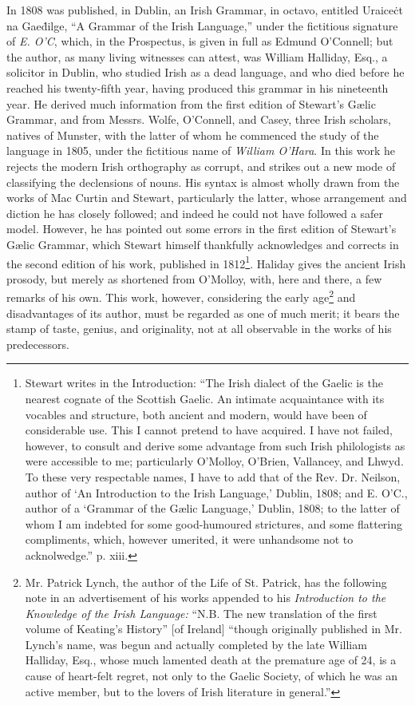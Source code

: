 \documentclass[11pt,oneside]{memoir}
\begin{document}
In 1808 was published, in Dublin, an Irish Grammar, in octavo, entitled \gaelicfont Uraiceċt na Gaeḋilge\normalfont, ``A Grammar of the Irish Language,'' under the fictitious signature of \textit{E. O'C}, which, in the Prospectus, is given in full as Edmund O'Connell;
but the author, as many living witnesses can attest, was William Halliday, Esq., a solicitor in Dublin, who studied Irish as a dead language, and who died before he reached his twenty-fifth year, having produced this grammar in his nineteenth year.
He derived much information from the first edition of Stewart's Gælic Grammar, and from Messrs. Wolfe, O'Connell, and Casey, three Irish scholars, natives of Munster, with the latter of whom he commenced the study of the language in 1805, under the fictitious name of \textit{William O'Hara}. 
In this work he rejects the modern Irish orthography as corrupt, and strikes out a new mode of classifying the declensions of nouns.
His syntax is almost wholly drawn from the works of Mac Curtin and Stewart, particularly the latter, whose arrangement and diction he has closely followed; and indeed he could not have followed a safer model.
However, he has pointed out some errors in the first edition of Stewart's Gælic Grammar, which Stewart himself thankfully acknowledges and corrects in the second edition of his work, published in 1812\footnote{
    Stewart writes in the Introduction: ``The Irish dialect of the Gaelic is the nearest cognate of the Scottish Gaelic.
    An intimate acquaintance with its vocables and structure, both ancient and modern, would have been of considerable use.
    This I cannot pretend to have acquired.
    I have not failed, however, to consult and derive some advantage from such Irish philologists as were accessible to me;
    particularly O'Molloy, O'Brien, Vallancey, and Lhwyd.
    To these very respectable names, I have to add that of the Rev. Dr. Neilson, author of `An Introduction to the Irish Language,' Dublin, 1808; and E. O'C., author of a `Grammar of the Gælic Language,' Dublin, 1808;
    to the latter of whom I am indebted for some good-humoured strictures, and some flattering compliments, which, however umerited, it were unhandsome not to acknolwedge.'' p. xiii.
}.
Haliday gives the ancient Irish prosody, but merely as shortened from O'Molloy, with, here and there, a few remarks of his own.
This work, however, considering the early age\footnote{
    Mr. Patrick Lynch, the author of the Life of St. Patrick, has the following note in an advertisement of his works appended to his \textit{Introduction to the Knowledge of the Irish Language:}
    ``N.B. The new translation of the first volume of Keating's History'' [of Ireland] ``though originally published in Mr. Lynch's name, was begun and actually completed by the late William Halliday, Esq., whose much lamented death at the premature age of 24, is a cause of heart-felt regret, not only to the Gaelic Society, of which he was an active member, but to the lovers of Irish literature in general.''
} and disadvantages of its author, must be regarded as one of much merit;
it bears the stamp of taste, genius, and originality, not at all observable in the works of his predecessors. 
\end{document}

